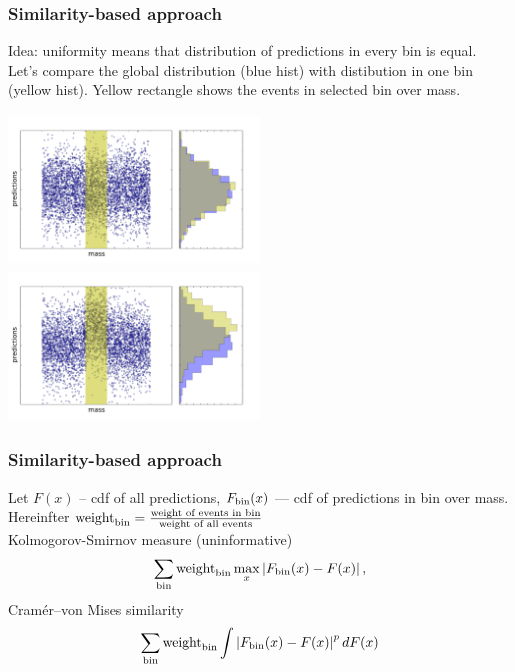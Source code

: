 \documentclass{beamer}
\begin{document}
\begin{frame}
    \frametitle{Similarity-based approach}
    Idea: uniformity means that distribution of predictions in every bin is equal. 
    \bigskip \\ 
    {\small
  	Let's compare the global distribution (blue hist) 
  	with distibution in one bin (yellow hist).
  	Yellow rectangle shows the events in selected bin over mass.
  	}

    \includegraphics[width=0.5\textwidth, height=4cm]{img/uniform_hist.pdf}
    \includegraphics[width=0.5\textwidth, height=4cm]{img/nonuniform_hist.pdf}    

\end{frame}

\begin{frame}[t]
    \frametitle{Similarity-based approach}

    Let $F(x)$ -- cdf of all predictions, $F_{\text{bin}}(x)$ --- cdf of predictions in bin over mass. Hereinfter $\text{weight}_\text{bin} = \frac{\text{weight of events in bin}}{\text{weight of all events}}$ 
    \bigskip \\


    Kolmogorov-Smirnov measure (uninformative)
    \[
    	\sum_{\text{bin}} \text{weight}_\text{bin} \max_x \left\vert F_{\text{bin}}(x) - F(x)\right\vert,
    \]
    Cram\'er--von Mises similarity 
    \[
    	 \sum_{\text{bin}} \text{weight}_\text{bin} \int \left\vert F_{\text{bin}}(x) - F(x)\right\vert^p dF(x)
    \]
\end{frame}
\end{document}
